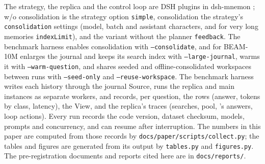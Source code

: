 The strategy, the replica and the \jev{} control loop are DSH plugins in dsh-mnemon \citep{mnemon2026code}; \sys{} w/o consolidation is the strategy option \texttt{simple}, consolidation the strategy's \texttt{consolidation} settings (model, batch and assistant characters, and for very long memories \texttt{indexLimit}), and the variant without the planner \texttt{feedback}.
The benchmark harness enables consolidation with \texttt{--consolidate}, and for BEAM-10M enlarges the journal and keeps its search index with \texttt{--large-journal}, warms it with \texttt{--warm-question}, and shares seeded and offline-consolidated workspaces between runs with \texttt{--seed-only} and \texttt{--reuse-workspace}.
The benchmark harness writes each history through the journal Source, runs the replica and main instances as separate workers, and records, per question, the rows (answer, tokens by class, latency), the View, and the replica's traces (searches, pool, \jev's answers, loop actions).
Every run records the code version, dataset checksum, models, prompts and concurrency, and can resume after interruption.
The numbers in this paper are computed from those records by \texttt{docs/paper/scripts/collect.py}; the tables and figures are generated from its output by \texttt{tables.py} and \texttt{figures.py}.
The pre-registration documents and reports cited here are in \texttt{docs/reports/}.

